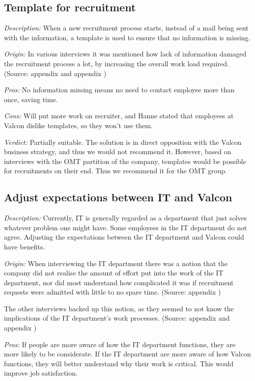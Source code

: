 \subsection{Template for recruitment}
\emph{Description:} When a new recruitment process starts, instead of a mail being sent with the information, a template is used to ensure that no information is missing.

\emph{Origin:}
In various interviews it was mentioned how lack of information damaged the recruitment process a lot, by increasing the overall work load required.
(Source: appendix  and appendix )

\noindent \emph{Pros:} No information missing means no need to contact employee more than once, saving time.

\noindent \emph{Cons:} Will put more work on recruiter, and Hanne stated that employees at Valcon dislike templates, so they won't use them.

\emph{Verdict:}
Partially suitable. The solution is in direct opposition with the Valcon business strategy, and thus we would not recommend it. However, based on interviews with the OMT partition of the company, templates would be possible for recruitments on their end. Thus we recommend it for the OMT group.

\subsection{Adjust expectations between IT and Valcon}
\emph{Description:} Currently, IT is generally regarded as a department that just solves whatever problem one might have. Some employees in the IT department do not agree. Adjusting the expectations between the IT department and Valcon could have benefits.

\emph{Origin:}
When interviewing the IT department there was a notion that the company did not realise the amount of effort put into the work of the IT department, nor did most understand how complicated it was if recruitment requests were admitted with little to no spare time.
(Source: appendix )

The other interviews backed up this notion, as they seemed to not know the implications of the IT department's work processes.
(Source: appendix  and appendix )

\noindent \emph{Pros:}
If people are more aware of how the IT department functions, they are more likely to be considerate. If the IT department are more aware of how Valcon functions, they will better understand why their work is critical. This would improve job satisfaction.

